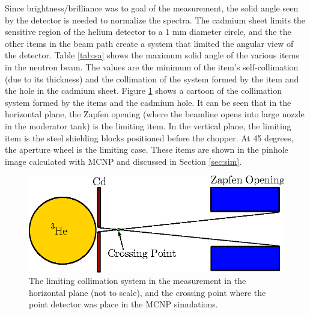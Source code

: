 \documentclass[preprint,12pt]{elsarticle}
\begin{document}
Since brightness/brilliance was to goal of the measurement, the solid angle seen by the detector is needed to normalize the spectra.  The cadmium sheet limits the sensitive region of the helium detector to a 1 mm diameter circle, and the the other items in the beam path create a system that limited the angular view of the detector.  Table \ref{tab:sa} shows the maximum solid angle of the various items in the neutron beam.  The values are the minimum of the item's self-collimation (due to its thickness) and the collimation of the system formed by the item and the hole in the cadmium sheet.  Figure \ref{fig:solid_angle} shows a cartoon of the collimation system formed by the items and the cadmium hole.  It can be seen that in the horizontal plane, the Zapfen opening (where the beamline opens into large nozzle in the moderator tank) is the limiting item.  In the vertical plane, the limiting item is the steel shielding blocks positioned before the chopper.  At 45 degrees, the aperture wheel is the limiting case.  These items are shown in the pinhole image calculated with MCNP and discussed in Section \ref{sec:sim}.

\begin{figure}[h!] 
  \centering
    \includegraphics[width=\columnwidth]{graphics/solid_angle.eps}
     \caption{The limiting collimation system in the measurement in the horizontal plane (not to scale), and the crossing point where the point detector was place in the MCNP simulations. \label{fig:solid_angle}}
\end{figure}
\end{document}
